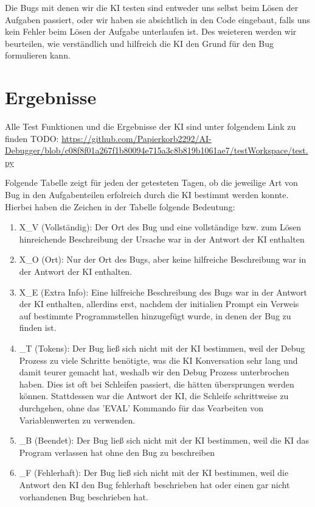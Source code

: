 \documentclass[a4paper,12pt,ngerman]{scrartcl}
\begin{document}
Die Bugs mit denen wir die KI testen sind entweder uns selbst beim Lösen der Aufgaben passiert, oder wir haben sie absichtlich in den Code eingebaut, falls uns kein Fehler beim Lösen der Aufgabe unterlaufen ist. Des weieteren werden wir beurteilen, wie verständlich und hilfreich die KI den Grund für den Bug formulieren kann.

\section{Ergebnisse}

Alle Test Funktionen und die Ergebnisse der KI sind unter folgendem Link zu finden TODO: \url{https://github.com/Papierkorb2292/AI-Debugger/blob/c08f8f01a267f1b80094e715a3c8b819b1061ae7/testWorkspace/test.py}

Folgende Tabelle zeigt für jeden der getesteten Tagen, ob die jeweilige Art von Bug in den Aufgabenteilen erfolreich durch die KI bestimmt werden konnte. Hierbei haben die Zeichen in der Tabelle folgende Bedeutung:
\begin{enumerate}
\item X_V (Vollständig): Der Ort des Bug und eine vollständige bzw. zum Lösen hinreichende Beschreibung der Ursache war in der Antwort der KI enthalten
\item X_O (Ort): Nur der Ort des Bugs, aber keine hilfreiche Beschreibung war in der Antwort der KI enthalten.
\item X_E (Extra Info): Eine hilfreiche Beschreibung des Bugs war in der Antwort der KI enthalten, allerdins erst, nachdem der initialien Prompt ein Verweis auf bestimmte Programmstellen hinzugefügt wurde, in denen der Bug zu finden ist.
\item _T (Tokens): Der Bug ließ sich nicht mit der KI bestimmen, weil der Debug Prozess zu viele Schritte benötigte, was die KI Konversation sehr lang und damit teurer gemacht hat, weshalb wir den Debug Prozess unterbrochen haben. Dies ist oft bei Schleifen passiert, die hätten übersprungen werden können. Stattdessen war die Antwort der KI, die Schleife schrittweise zu durchgehen, ohne das 'EVAL' Kommando für das Vearbeiten von Variablenwerten zu verwenden.
\item _B (Beendet):   Der Bug ließ sich nicht mit der KI bestimmen, weil die KI das Program verlassen hat ohne den Bug zu beschreiben
\item _F (Fehlerhaft): Der Bug ließ sich nicht mit der KI bestimmen, weil die Antwort den KI den Bug fehlerhaft beschrieben hat oder einen gar nicht vorhandenen Bug beschrieben hat.
\end{enumerate}
\end{document}
